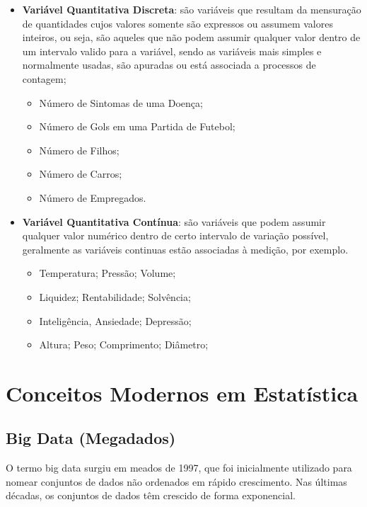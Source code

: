 \begin{itemize}
  \item \textbf{Variável Quantitativa Discreta}: são variáveis que resultam da mensuração de quantidades cujos valores somente são expressos ou assumem valores inteiros, ou seja, são aqueles que não podem assumir qualquer valor dentro de um intervalo valido para a variável, sendo as variáveis mais simples e normalmente usadas, são apuradas ou está associada a processos de contagem;

 \begin{itemize}
   \item Número de Sintomas de uma Doença;
   \item Número de Gols em uma Partida de Futebol;
   \item Número de Filhos;
   \item Número de Carros;
   \item Número de Empregados.
 \end{itemize}
  \item \textbf{Variável Quantitativa Contínua}: são variáveis que podem assumir qualquer valor numérico dentro de certo intervalo de variação possível, geralmente as variáveis continuas estão associadas à medição, por exemplo.
\begin{itemize}
  \item Temperatura; Pressão; Volume;
  \item Liquidez; Rentabilidade; Solvência;
  \item Inteligência, Ansiedade; Depressão;
  \item Altura; Peso; Comprimento; Diâmetro;
\end{itemize}
\end{itemize}



\newpage
\section{Conceitos Modernos em Estatística}

\subsection{Big Data (Megadados)}
O termo big data surgiu em meados de 1997, que foi inicialmente utilizado para nomear conjuntos de dados não ordenados em rápido crescimento. Nas últimas décadas, os conjuntos de dados têm crescido de forma exponencial.\vst

